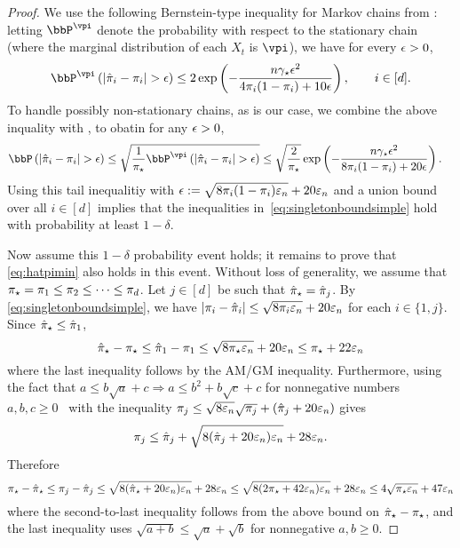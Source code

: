 \begin{proof}
  We use the following Bernstein-type inequality for Markov chains
  from \citet[][Theorem~3.8]{paulin15}: letting $\bbP^{\vpi}$ denote
  the probability with respect to the stationary chain (where the
  marginal distribution of each $X_t$ is $\vpi$), we have for every
  $\epsilon>0$,
  \[
    \bbP^{\vpi}
    \Parens{
      \abs{ \hat\pi_i-\pi_i} > \eps
    } \le
    2\exp\Parens{
      -\frac{
        n\gap\eps^2
      }{
        4\pi_i(1-\pi_i)+10\eps
      }
    },
    \qquad i\in[d]
    .
  \]
  To handle possibly non-stationary chains, as is our case, we combine
  the above inquality with \citet[][Proposition 3.14]{paulin15}, to
  obatin for any $\epsilon>0$,
  \begin{align*}
    \bbP
    \Parens{
      \abs{ \hat\pi_i-\pi_i} > \eps
    }
    &\le
    \sqrt{
      \frac1\pimin
      \bbP^{\vpi}
      \Parens{
        \abs{ \hat\pi_i-\pi_i} > \eps
      }
    } 
    \le
    \sqrt{\frac2\pimin}
    \exp\Parens{
      -\frac{
        n\gap\eps^2
      }{
        8\pi_i(1-\pi_i)+20\eps
      }
    }.
  \end{align*}
  Using this tail inequalitiy with $\epsilon :=
  \sqrt{8\pi_i(1-\pi_i)\varepsilon_n} + 20\varepsilon_n$ and a union bound over
  all $i \in [d]$ implies that the inequalities
  in~\cref{eq:singletonboundsimple} hold with probability at least
  $1-\delta$.

  Now assume this $1-\delta$ probability event holds; it remains to
  prove that \cref{eq:hatpimin} also holds in this event.
  Without loss of generality, we assume that $\pi_{\star} = \pi_1 \leq
  \pi_2 \leq \dotsb \leq \pi_d$.
  Let $j \in [d]$ be such that $\hat\pi_{\star} = \hat\pi_j$.
  By \cref{eq:singletonboundsimple}, we have $|\pi_i - \hat\pi_i| \leq
  \sqrt{8\pi_i\varepsilon_n} + 20\varepsilon_n$ for each $i \in \{1,j\}$.
  Since $\hat\pi_{\star} \leq \hat\pi_1$,
  \[
    \hat\pi_{\star} - \pi_{\star}
    \leq \hat\pi_1 - \pi_1
    \leq \sqrt{8\pi_{\star}\varepsilon_n} + 20\varepsilon_n
    \leq \pi_{\star} + 22\varepsilon_n
  \]
  where the last inequality follows by the AM/GM inequality.
  Furthermore, using the fact that $a \leq b\sqrt{a} + c \Rightarrow a
  \leq b^2 + b\sqrt{c} + c$ for nonnegative numbers $a, b, c \geq
  0$~\citep[see, e.g.,][]{BBL04} with the inequality $\pi_j \leq
  \sqrt{8\varepsilon_n} \sqrt{\pi_j} + (\hat\pi_j + 20\varepsilon_n)$ gives
  \[
    \pi_j
    \leq 
    \hat\pi_j
    + \sqrt{8(\hat\pi_j + 20\varepsilon_n)\varepsilon_n}
    + 28\varepsilon_n
    .
  \]
  Therefore
  \[
    \pi_{\star} - \hat\pi_{\star}
    \leq \pi_j - \hat\pi_j
    \leq \sqrt{8(\hat\pi_{\star} + 20\varepsilon_n)\varepsilon_n} + 28\varepsilon_n
    \leq \sqrt{8(2\pi_{\star} + 42\varepsilon_n)\varepsilon_n} + 28\varepsilon_n
    \leq 4\sqrt{\pi_{\star}\varepsilon_n} + 47\varepsilon_n
  \]
  where the second-to-last inequality follows from the above bound on
  $\hat\pi_{\star} - \pi_{\star}$, and the last inequality uses $\sqrt{a+b} \leq
  \sqrt{a} + \sqrt{b}$ for nonnegative $a,b \geq 0$.
\end{proof}

